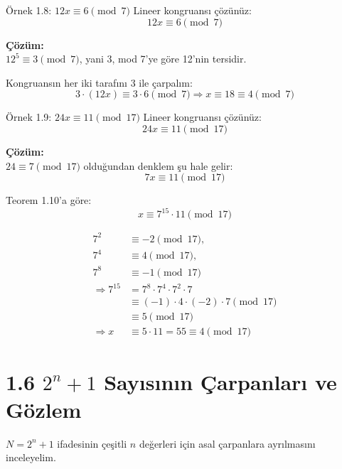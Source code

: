 \documentclass[12pt]{article}
\begin{document}
\begin{examplebox}{Örnek 1.8: $12x \equiv 6 \pmod{7}$}
Lineer kongruansı çözünüz:
\[
12x \equiv 6 \pmod{7}
\]

\textbf{Çözüm:}\\
$12^5 \equiv 3 \pmod{7}$, yani 3, mod 7'ye göre 12'nin tersidir.

Kongruansın her iki tarafını 3 ile çarpalım:
\[
3 \cdot (12x) \equiv 3 \cdot 6 \pmod{7} \Rightarrow x \equiv 18 \equiv 4 \pmod{7}
\]
\end{examplebox}

\begin{examplebox}{Örnek 1.9: $24x \equiv 11 \pmod{17}$}
Lineer kongruansı çözünüz:
\[
24x \equiv 11 \pmod{17}
\]

\textbf{Çözüm:}\\
$24 \equiv 7 \pmod{17}$ olduğundan denklem şu hale gelir:
\[
7x \equiv 11 \pmod{17}
\]

Teorem 1.10'a göre:
\[
x \equiv 7^{15} \cdot 11 \pmod{17}
\]

\begin{align*}
7^2 &\equiv -2 \pmod{17}, \\
7^4 &\equiv 4 \pmod{17}, \\
7^8 &\equiv -1 \pmod{17} \\
\Rightarrow 7^{15} &= 7^8 \cdot 7^4 \cdot 7^2 \cdot 7 \\
&\equiv (-1) \cdot 4 \cdot (-2) \cdot 7 \pmod{17} \\
&\equiv 5 \pmod{17} \\
\Rightarrow x &\equiv 5 \cdot 11 = 55 \equiv 4 \pmod{17}
\end{align*}
\end{examplebox}

\section*{1.6 $2^n + 1$ Sayısının Çarpanları ve Gözlem}

$N = 2^n + 1$ ifadesinin çeşitli $n$ değerleri için asal çarpanlara ayrılmasını inceleyelim.  
\end{document}
